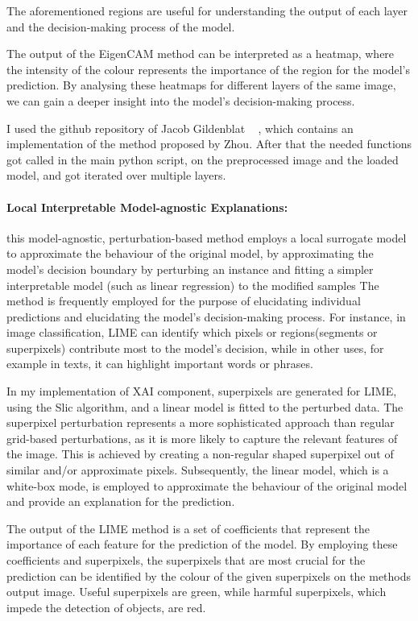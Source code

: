 The aforementioned regions are useful for understanding the output of each layer and the decision-making process of the model.

The output of the EigenCAM method can be interpreted as a heatmap, where the intensity of the colour represents the importance of
the region for the model's prediction.
By analysing these heatmaps for different layers of the same image, we can gain a deeper insight into the model's decision-making process.

I used the github repository of Jacob Gildenblat ~\cite{jacobgilpytorchcam}
, which contains an implementation of the method proposed by Zhou\cite{Zhou_2016}.
After that the needed functions got called in the main python script, on the preprocessed image and the loaded model, and got iterated over multiple layers.

\paragraph{Local Interpretable Model-agnostic Explanations:}\label{par:lime}

this model-agnostic, perturbation-based method employs a local surrogate model to approximate the behaviour of the original model, by
approximating the model's decision boundary by perturbing an instance and fitting a simpler interpretable model (such as linear regression) to the modified samples
The method is frequently employed for the purpose of elucidating individual predictions and elucidating the model's decision-making process. For instance, in image classification, LIME can identify which pixels or regions(segments or superpixels) contribute most to the model's decision, while in other uses, for example in texts, it can highlight important words or phrases.

In my implementation of XAI component,  superpixels are generated for LIME, using the Slic algorithm, and a linear model is fitted to the perturbed data.
The superpixel perturbation represents a more sophisticated approach than regular grid-based perturbations, as it is more likely to capture the relevant features of the image.
This is achieved by creating a non-regular shaped superpixel out of similar and/or approximate pixels.
Subsequently, the linear model, which is a white-box mode, is employed to approximate the behaviour of the original model and provide an explanation for the prediction.

The output of the LIME method is a set of coefficients that represent the importance of each feature for the prediction of the model.
By employing these coefficients and superpixels, the superpixels that are most crucial for the prediction can be identified by the
colour of the given superpixels on the methods output image.
Useful superpixels are green, while harmful superpixels, which impede the detection of objects, are red.

